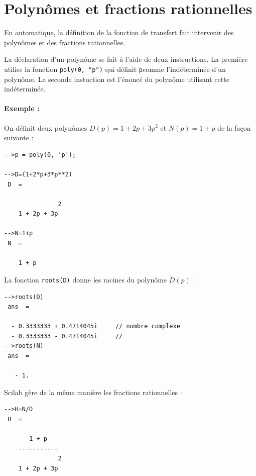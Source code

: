 \section{Polynômes et fractions rationnelles}
En automatique, la définition de la fonction de transfert 
fait intervenir des polynômes et des fractions rationnelles.

La déclaration d'un polynôme se fait à l'aide de deux instructions. 
La première utilise la fonction \verb?poly(0, "p")? qui définit \og \verb?p?\fg comme 
l'indéterminée d'un polynôme. 
La seconde instuction est l'énoncé du polynôme utilisant cette indéterminée. 

\paragraph{Exemple :}

On définit deux polynômes $D(p)=1+2p+3p^2$ et $N(p)=1+p$ de la façon suivante :
\begin{code}
\begin{verbatim}
-->p = poly(0, 'p');

-->D=(1+2*p+3*p**2)
 D  =
 
               2  
    1 + 2p + 3p 

-->N=1+p
 N  =
 
    1 + p
\end{verbatim}
\end{code}

La fonction \verb?roots(D)? donne les racines du polynôme $D(p)$ :

\begin{code}
\begin{verbatim}
-->roots(D)
 ans  =
 
  - 0.3333333 + 0.4714045i     // nombre complexe 
  - 0.3333333 - 0.4714045i     // 
-->roots(N)
 ans  =
  
   - 1.
\end{verbatim}
\end{code}

Scilab gère de la même manière les fractions rationnelles :
\begin{code}
\begin{verbatim}
-->H=N/D
 H  =
 
       1 + p      
    -----------   
               2  
    1 + 2p + 3p 
\end{verbatim}
\end{code}

